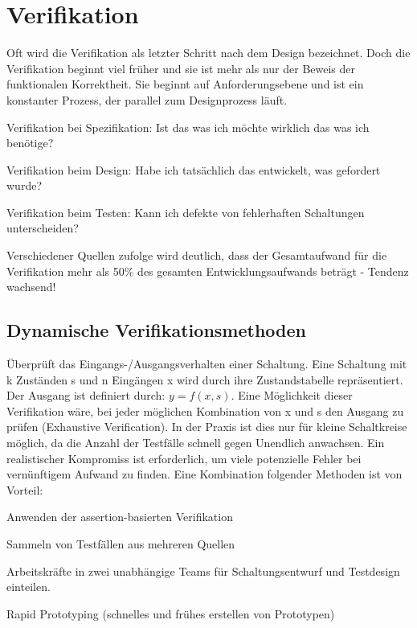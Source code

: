 \section{Verifikation}
Oft wird die Verifikation als letzter Schritt nach dem Design bezeichnet. Doch die Verifikation beginnt viel früher und sie ist mehr als nur der Beweis der funktionalen Korrektheit. Sie beginnt auf Anforderungsebene und ist ein konstanter Prozess, der parallel zum Designprozess läuft.
\begin{compactitem}
    \item Verifikation bei Spezifikation: Ist das was ich möchte wirklich das was ich benötige? 
    \item Verifikation beim Design: Habe ich tatsächlich das entwickelt, was gefordert wurde?
    \item Verifikation beim Testen: Kann ich defekte von fehlerhaften Schaltungen unterscheiden? 
\end{compactitem}
Verschiedener Quellen zufolge wird deutlich, dass der Gesamtaufwand für die Verifikation mehr als 50\% des gesamten Entwicklungsaufwands beträgt - Tendenz wachsend! 
\subsection{Dynamische Verifikationsmethoden}
Überprüft das Eingangs-/Ausgangsverhalten einer Schaltung. Eine Schaltung mit k Zuständen s und n Eingängen x wird durch ihre Zustandstabelle repräsentiert. Der Ausgang ist definiert durch: $y=f(x,s)$. Eine Möglichkeit dieser Verifikation wäre, bei jeder möglichen Kombination von x und s den Ausgang zu prüfen (Exhaustive Verification). In der Praxis ist dies nur für kleine Schaltkreise möglich, da die Anzahl der Testfälle schnell gegen Unendlich anwachsen. Ein realistischer Kompromiss ist erforderlich, um viele potenzielle Fehler bei vernünftigem Aufwand zu finden. Eine Kombination folgender Methoden ist von Vorteil:
\begin{compactitem}
    \item Anwenden der assertion-basierten Verifikation 
    \item Sammeln von Testfällen aus mehreren Quellen 
    \item Arbeitskräfte in zwei unabhängige Teams für Schaltungsentwurf und Testdesign einteilen.
    \item Rapid Prototyping (schnelles und frühes erstellen von Prototypen)
\end{compactitem}
